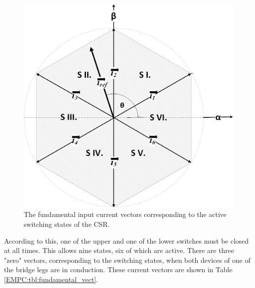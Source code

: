     \begin{figure}[!ht]
        \centering
        \includegraphics[width=.6\textwidth]{EMPC_PNG_Pics/VectorPhasor.png}
        \caption{The fundamental input current vectors corresponding to the active switching states of the CSR.}
        \label{EMPC:fig:VectorPhasor}
    \end{figure}

    According to this, one of the upper and one of the lower switches must be closed at all times. This allows nine states, six of which are active. There are three "zero" vectors, corresponding to the switching states, when both devices of one of the bridge legs are in conduction. These current vectors are shown in Table \ref{EMPC:tbl:fundamental_vect}.




